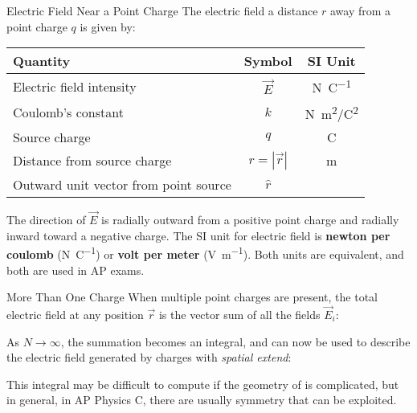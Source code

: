 \documentclass[12pt,aspectratio=169]{beamer}
\begin{document}
\begin{frame}{Electric Field Near a Point Charge}
  The electric field a distance $r$ away from a point charge $q$ is given by:

  \begin{center}
    \begin{tabular}{l|c|c}
      \rowcolor{pink}
      \textbf{Quantity} & \textbf{Symbol} & \textbf{SI Unit} \\ \hline
      Electric field intensity    & $\vec E$ & \si{\newton\per\coulomb}\\
      Coulomb's constant          & $k$   & \si{N.m^2/C^2} \\
      Source charge               & $q$   & \si\coulomb \\
      Distance from source charge & $r=|\vec r|$ & \si\metre \\
      Outward unit vector from point source & $\hat r$ &
    \end{tabular}
  \end{center}
  The direction of $\vec E$ is radially outward from a positive point charge
  and radially inward toward a negative charge. The SI unit for electric field
  is \textbf{newton per coulomb} (\si{\newton\per\coulomb}) or
  \textbf{volt per meter} (\si{\volt\per\metre}). Both units are equivalent,
  and both are used in AP exams.
\end{frame}



\begin{frame}{More Than One Charge}
  When multiple point charges are present, the total electric field at any
  position $\vec r$ is the vector sum of all the fields $\vec E_i$:
    

  As $N\rightarrow\infty$, the summation becomes an integral, and can now be
  used to describe the electric field generated by charges with
  \emph{spatial extend}:

  
  This integral may be difficult to compute if the geometry of is complicated,
  but in general, in AP Physics C, there are usually symmetry that can be
  exploited.
\end{frame}
\end{document}
